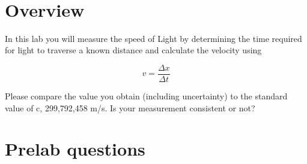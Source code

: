 \documentclass{tufte-handout}
\begin{document}



\vspace{0.5cm}
\\
\vspace{0.5cm}

\section{Overview}
    In this lab you will measure the speed of
    Light by determining the time required for light to traverse a known
    distance and calculate
    the velocity using

    $$v = \frac{\Delta x}{\Delta t}$$

    Please compare the value you obtain (including uncertainty) to the standard value of c,
    299,792,458 m/s. Is your measurement consistent or not?

\section{Prelab questions}
\end{document}
